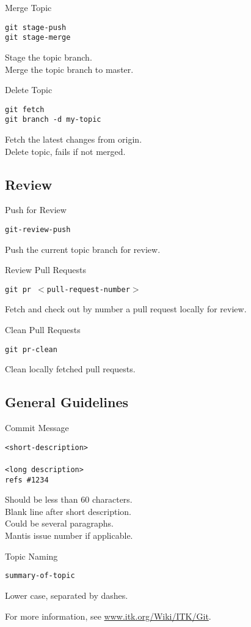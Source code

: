 \documentclass[10pt]{article}
\newlength{\cvsep}
\newlength{\cvtitles}
\newlength{\cvmain}
\newenvironment{category}[1]
  {\parbox[t]{\cvtitles}{\large\sc\centering #1}\hspace*{\cvsep}\begin{minipage}[t]{\cvmain}}
  {\end{minipage}\vspace*{0.35cm}}
\begin{document}
\begin{category}{Merge Topic}
\parbox[t]{0.6\cvmain}{%
  \texttt{git stage-push\\ git stage-merge}
}
\parbox[t]{0.38\cvmain}{%
Stage the topic branch.\\
Merge the topic branch to master.
}
\end{category}
\begin{category}{Delete Topic}
\parbox[t]{0.6\cvmain}{%
  \texttt{git fetch\\ git branch -d my-topic}
}
\parbox[t]{0.38\cvmain}{%
Fetch the latest changes from origin.\\
Delete topic, fails if not merged.
}
\end{category}

\subsection*{Review}
\begin{category}{Push for Review}
\parbox[t]{0.6\cvmain}{%
  \texttt{git-review-push}
}
\parbox[t]{0.38\cvmain}{%
Push the current topic branch for review.
}
\end{category}
\begin{category}{Review Pull Requests}
\parbox[t]{0.6\cvmain}{%
  \texttt{git pr $<$pull-request-number$>$}
}
\parbox[t]{0.38\cvmain}{%
Fetch and check out by number a pull request locally for review.
}
\end{category}
\begin{category}{Clean Pull Requests}
\parbox[t]{0.6\cvmain}{%
  \texttt{git pr-clean}
}
\parbox[t]{0.38\cvmain}{%
Clean locally fetched pull requests.
}
\end{category}

\subsection*{General Guidelines}
\begin{category}{Commit Message}
\parbox[t]{0.6\cvmain}{%
  \texttt{<short-description>\\ \\ <long description>\\ refs \#1234}
}
\parbox[t]{0.38\cvmain}{%
Should be less than 60 characters.\\
Blank line after short description.\\
Could be several paragraphs.\\
Mantis issue number if applicable.
}
\end{category}
\begin{category}{Topic Naming}
\parbox[t]{0.6\cvmain}{%
  \texttt{summary-of-topic}
}
\parbox[t]{0.38\cvmain}{%
Lower case, separated by dashes.
}
\end{category}


\begin{center}
For more information, see \href{http://www.itk.org/Wiki/ITK/Git}{www.itk.org/Wiki/ITK/Git}.
\end{center}
\end{document}
